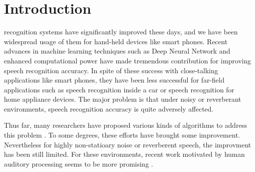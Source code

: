 \documentclass[journal]{IEEEtran}
\begin{document}
%



\section{Introduction}
\cite{J_Allen_JASA_1979}
 recognition systems have significantly improved
these days, and we have been widespread usage of them
for hand-held devices like smart phones. 
Recent advances in machine learning techniques such 
as Deep Neural Network \cite{G_Hinton_IEEE_Signal_Process_Mag_2012}
and enhanced computational power \cite{V_Vanhoucke_Deep_Learning_NIPS_Workshop_2011}
have made tremendous contribution for improving speech recognition accuracy.
In spite of these success with close-talking applications
 like smart phones, they have been less successful for 
far-field applications such as
speech recognition inside a car or speech recognition for
home appliance devices. The major problem is that under
noisy or reverberant environments, speech recognition
accuracy is quite adversely affected.

Thus far, many researchers have proposed various kinds of algorithms
to address this problem  \cite{P_J_Moreno_ICASSP_1996,
R_M_Stern_ETRW_1997, C_Kim_ASRU_2009_2, C_Kim_ICASSP_2012_1,
C_Kim_ICASSP_2012_2}. To some degrees, these efforts have brought
some improvement. Nevertheless for highly non-statioary noise
or reverberent speech, the improvment has been still limited.
For these environments, recent work motivated by human 
auditory processing seems to be more promising
\cite{C_Kim_ICASSP_2012_1, C_Kim_INTERSPEECH_2010_2, 
C_Kim_ICASSP_2010_1, C_Kim_INTERSPEECH_2006}.
\end{document}
